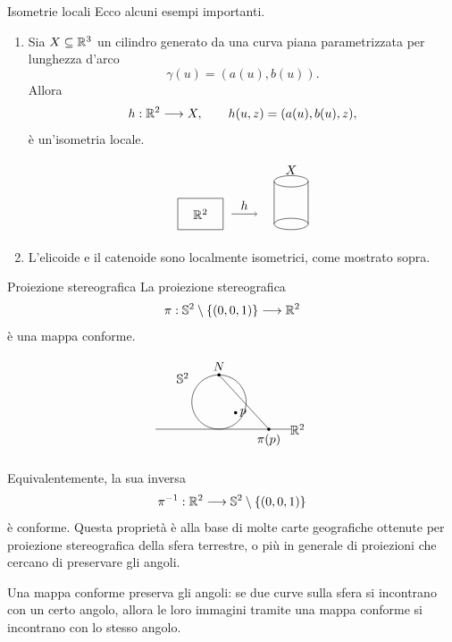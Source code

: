 \documentclass[a4paper]{article}
\begin{document}
\begin{snippetexample}{Isometrie locali}
Ecco alcuni esempi importanti.

\begin{enumerate}
\item Sia \(X\subseteq\mathbb{R}^3\) un cilindro generato da una curva piana parametrizzata per lunghezza d'arco
\[
        \gamma(u)=(a(u),b(u)).
\]
Allora
\[
        h:\mathbb{R}^2\longrightarrow X,
        \qquad
        h(u,z)=(a(u),b(u),z),
\]
è un'isometria locale.

\[
        \begin{tikzpicture}[scale=0.8]
            \draw (0,0) rectangle (1.6,1.1);
            \node at (0.8,0.55) {\(\realnumbers^2\)};
            \draw[->] (1.9,0.55) -- (2.8,0.55) node[midway,above] {\(h\)};
            \draw (4.0,0.2) ellipse (0.6 and 0.2);
            \draw (4.0,1.7) ellipse (0.6 and 0.2);
            \draw (3.4,0.2) -- (3.4,1.7);
            \draw (4.6,0.2) -- (4.6,1.7);
            \node at (4.0,2.1) {\(X\)};
        \end{tikzpicture}
\]

\item L'elicoide e il catenoide sono localmente isometrici, come mostrato sopra.
\end{enumerate}
\end{snippetexample}

\begin{snippetexample}{Proiezione stereografica}
La proiezione stereografica
\[
    \pi:\mathbb{S}^2\setminus\{(0,0,1)\}\longrightarrow\mathbb{R}^2
\]
è una mappa conforme.

\[
    \begin{tikzpicture}[scale=0.85]
        \draw (-2.1,0) -- (2.4,0);
        \draw (0,0.9) circle (0.9);
        \fill (0,1.8) circle (1.5pt) node[above] {\(N\)};
        \fill (0.55,0.55) circle (1.5pt) node[right] {\(p\)};
        \draw (0,1.8) -- (1.65,0);
        \fill (1.65,0) circle (1.5pt) node[below] {\(\pi(p)\)};
        \node at (2.6,0) {\(\realnumbers^2\)};
        \node at (-1.2,1.7) {\(\mathbb{S}^2\)};
    \end{tikzpicture}
\]

Equivalentemente, la sua inversa
\[
    \pi^{-1}:\mathbb{R}^2\longrightarrow\mathbb{S}^2\setminus\{(0,0,1)\}
\]
è conforme. Questa proprietà è alla base di molte carte geografiche ottenute per proiezione stereografica della sfera terrestre, o più in generale di proiezioni che cercano di preservare gli angoli.

Una mappa conforme preserva gli angoli: se due curve sulla sfera si incontrano con un certo angolo, allora le loro immagini tramite una mappa conforme si incontrano con lo stesso angolo.
\end{snippetexample}
\end{document}
